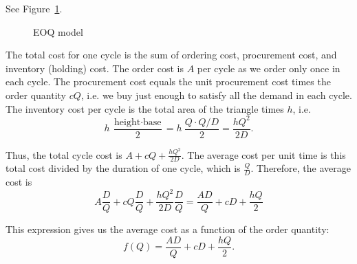 \begin{solution}
See Figure~\ref{fig:EOQ}.

\begin{figure}[htbp]
\centering
{}
\caption{EOQ model}
\label{fig:EOQ}
\end{figure}


The total cost for one cycle is the sum of ordering cost, procurement cost, and inventory (holding) cost. The order cost is $A$ per cycle as we order only once in each cycle. The procurement cost equals the unit procurement cost times the order quantity $cQ$, i.e. we buy just enough to satisfy all the demand in each cycle. The inventory cost per cycle is the total area of the triangle times $h$, i.e. 
\begin{equation*}
h~\frac{\text{height}\cdot\text{base}}{2} = h~\frac{Q \cdot Q/D }{2} = \frac{hQ^2}{2D}.
\end{equation*}

Thus, the total cycle cost is $A+cQ+\frac{hQ^2}{2D}$. The average cost per unit time is this total cost divided by the duration of one cycle, which is $\frac{Q}{D}$. Therefore, the average cost is
\begin{equation*}
A \frac{D}{Q}+cQ \frac{D}{Q} + \frac{hQ^2}{2D} \frac{D}{Q} = \frac{AD}{Q}+cD+\frac{hQ}{2}
\end{equation*}

This expression gives us the average cost as a function of the order quantity:
\begin{equation*}
f(Q) = \frac{AD}{Q}+cD+\frac{hQ}{2}.
\end{equation*}


\end{solution}
